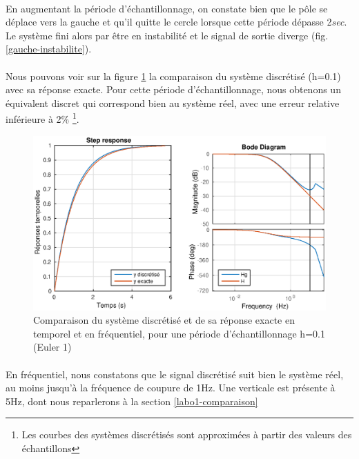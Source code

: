 \paragraph{}
En augmentant la période d'échantillonnage, on constate bien que le pôle se déplace vers la gauche et qu'il quitte le cercle lorsque cette période dépasse 2\textit{sec}. Le système fini alors par être en instabilité et le signal de sortie diverge (fig. \ref{gauche-instabilite}).

\paragraph{}
Nous pouvons voir sur la figure \ref{labo1-gauche-step} la comparaison du système discrétisé (h=0.1) avec sa réponse exacte. Pour cette période d'échantillonnage, nous obtenons un équivalent discret qui correspond bien au système réel, avec une erreur relative inférieure à 2\% \footnote{Les courbes des systèmes discrétisés sont approximées à partir des valeurs des échantillons}.

\begin{figure}[!h]
\center\includegraphics[width=1\linewidth]{eps/labo1-gauche-step}
\caption{Comparaison du système discrétisé et de sa réponse exacte en temporel et en fréquentiel, pour une période d'échantillonnage h=0.1 (Euler 1)}
\label{labo1-gauche-step}
\end{figure}

\paragraph{}
En fréquentiel, nous constatons que le signal discrétisé suit bien le système réel, au moins jusqu'à la fréquence de coupure de 1Hz. Une verticale est présente à 5Hz, dont nous reparlerons à la section \ref{labo1-comparaison}


